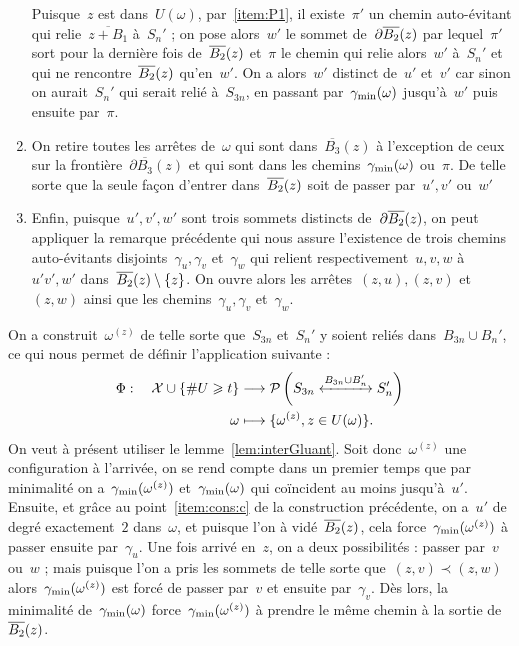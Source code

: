 \begin{dem}
\begin{enumerate}
					Puisque~$z$ est dans~$U(\omega)$, par~\ref{item:P1}, il existe~$\pi'$ un chemin auto-évitant qui relie~$\overline{z+B_1}$ à~$S_n'$ ; on pose alors~$w'$  le sommet de~$\partial\BRz$ par lequel~$\pi'$ sort pour la dernière fois de~$\BRz$ et~$\pi$ le chemin qui relie alors~$w'$ à~$S_n'$ et qui ne rencontre~$\BRz$ qu'en~$w'$. On a alors~$w'$ distinct de~$u'$ et~$v'$ car sinon on aurait~$S_n'$ qui serait relié à~$S_{3n}$, en passant par~$\Cmin$ jusqu'à~$w'$ puis ensuite par~$\pi$.
					\item\label{item:cons:c} On retire toutes les arrêtes de~$\omega$ qui sont dans~$\overline{B_3}(z)$ à l'exception de ceux sur la frontière~$\partial\overline{B_3}(z)$ et qui sont dans les chemins~$\Cmin$ ou~$\pi$. De telle sorte que la seule façon d'entrer dans~$\BRz$ soit de passer par~$u', v'$ ou~$w'$
					\item\label{item:cons:d} Enfin, puisque~$u',v',w'$ sont trois sommets distincts de~$\partial\BRz$, on peut appliquer la remarque précédente qui nous assure l'existence de trois chemins auto-évitants disjoints~$\gamma_u,\gamma_v$ et~$\gamma_w$  qui relient respectivement~$u,v,w$ à~$u'v',w'$ dans~$\BRz\priv\{z\}$.  On ouvre alors les arrêtes~$(z,u), (z,v)$ et~$(z,w)$ ainsi que les chemins~$\gamma_u,\gamma_v$ et~$\gamma_w$. 
				\end{enumerate}
				On a construit~$\omega^{(z)}$ de telle sorte que~$S_{3n}$ et~$S_n'$ y soient reliés dans~$B_{3n}\cup B_n'$, ce qui nous permet de définir l'application suivante :
				\begin{align*}
					\Phi : \quad \mathcal{X} \cup \{\# U \geq t\} 	& \longrightarrow 
							\mathcal{P}\left(
								\relie[B_{3n}\cup B_n']{S_{3n}}{S_n'}		
							\right)\\
								\omega	& \longmapsto  \{\omega^{(z)}, z\in U(\omega)\}.
				\end{align*}
				On veut à présent utiliser le lemme~\ref{lem:interGluant}. Soit donc~$\omega^{(z)}$ une configuration à l'arrivée, on se rend compte dans un premier temps que par minimalité on a~$\Cmin[\omega^{(z)}]$ et~$\Cmin$ qui coïncident au moins jusqu'à~$u'$. Ensuite, et grâce au point~\ref{item:cons:c} de la construction précédente, on a~$u'$ de degré exactement~$2$ dans~$\omega$, et puisque l'on à vidé~$\BRz$, cela force~$\Cmin[\omega^{(z)}]$ à passer ensuite par~$\gamma_u$. Une fois arrivé en~$z$, on a deux possibilités : passer par~$v$ ou~$w$ ; mais puisque l'on a pris les sommets de telle sorte que~$(z,v)\prec (z,w)$ alors~$\Cmin[\omega^{(z)}]$ est forcé de passer par~$v$ et ensuite par~$\gamma_v$. Dès lors, la minimalité de~$\Cmin$ force~$\Cmin[\omega^{(z)}]$ à prendre le même chemin à la sortie de~$\BRz$.
				

\end{dem}
